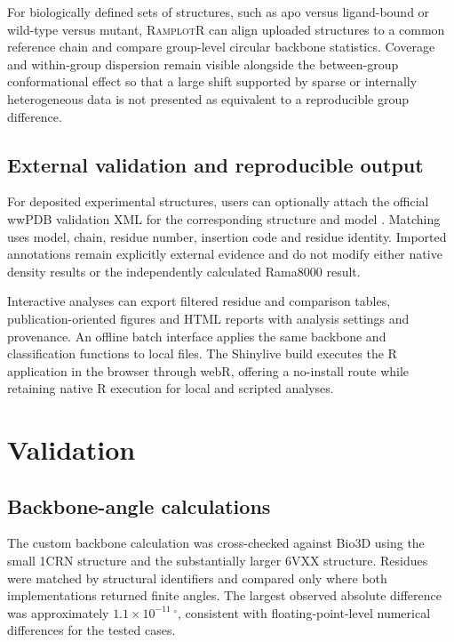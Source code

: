 \documentclass[11pt]{article}
\newcommand{\ramplotr}{\textsc{RamplotR}\xspace}
\begin{document}
For biologically defined sets of structures, such as apo versus ligand-bound or wild-type versus mutant, \ramplotr can align uploaded structures to a common reference chain and compare group-level circular backbone statistics. Coverage and within-group dispersion remain visible alongside the between-group conformational effect so that a large shift supported by sparse or internally heterogeneous data is not presented as equivalent to a reproducible group difference.

\subsection{External validation and reproducible output}

For deposited experimental structures, users can optionally attach the official wwPDB validation XML for the corresponding structure and model \citep{Gore2017}. Matching uses model, chain, residue number, insertion code and residue identity. Imported annotations remain explicitly external evidence and do not modify either native density results or the independently calculated Rama8000 result.

Interactive analyses can export filtered residue and comparison tables, publication-oriented figures and HTML reports with analysis settings and provenance. An offline batch interface applies the same backbone and classification functions to local files. The Shinylive build executes the R application in the browser through webR, offering a no-install route while retaining native R execution for local and scripted analyses.

\section{Validation}

\subsection{Backbone-angle calculations}

The custom backbone calculation was cross-checked against Bio3D \citep{Grant2006} using the small 1CRN structure and the substantially larger 6VXX structure. Residues were matched by structural identifiers and compared only where both implementations returned finite angles. The largest observed absolute difference was approximately $1.1\times10^{-11}\,^\circ$, consistent with floating-point-level numerical differences for the tested cases.
\end{document}
